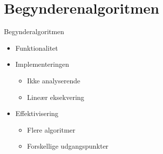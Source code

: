 \section{Begynderenalgoritmen}
\begin{frame}{Begynderalgoritmen}
\begin{itemize}
	\item Funktionalitet
	\item Implementeringen
	\begin{itemize}
		\item Ikke analyserende
		\item Line\ae{}r eksekvering
	\end{itemize}
	\item Effektivisering
	\begin{itemize}
		\item Flere algoritmer
		\item Forskellige udgangspunkter
	\end{itemize}
\end{itemize}
\end{frame}